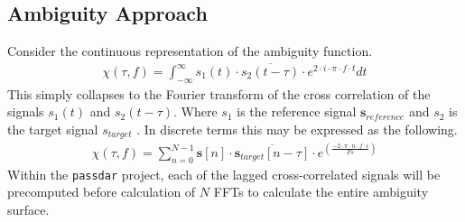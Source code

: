 \documentclass{article}
\begin{document}
\subsection{Ambiguity Approach}
Consider the continuous representation of the ambiguity function.
\begin{align*}
  \chi(\tau, f)=\int_{-\infty}^{\infty}s_1(t)\cdot\overline{s_2(t-\tau)}\cdot e^{2\cdot i\cdot\pi\cdot f\cdot t}dt
\end{align*}
This simply collapses to the Fourier transform of the cross correlation of the signals $s_1(t)$ and $s_2(t-\tau)$. Where $s_1$ is the reference signal $\bm{s}_{reference}$ and $s_2$ is the target signal $s_{target}$ \parencite{YatrakisAmbiguity}. In discrete terms this may be expressed as the following.
\begin{align*}
  \chi(\tau, f)=\sum_{n=0}^{N-1}\bm{s}[n]\cdot\overline{\bm{s}_{target}[n-\tau]}\cdot e^{\left(\frac{-2\cdot\pi\cdot n\cdot f\cdot i}{Fs}\right)}
\end{align*}
Within the \texttt{passdar} project, each of the lagged cross-correlated signals will be precomputed before calculation of $N$ FFTs to calculate the entire ambiguity surface.


\nocite{*}
\printbibliography
\end{document}
